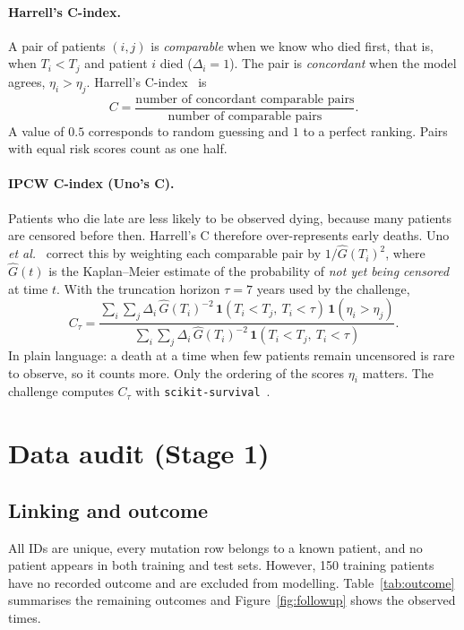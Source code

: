 \documentclass[11pt,a4paper]{article}
\begin{document}
\paragraph{Harrell's C-index.}
A pair of patients $(i,j)$ is \emph{comparable} when we know who died first, that is,
when $T_i < T_j$ and patient $i$ died ($\Delta_i = 1$). The pair is \emph{concordant}
when the model agrees, $\eta_i > \eta_j$. Harrell's C-index~\cite{harrell1982} is
\begin{equation}
C = \frac{\text{number of concordant comparable pairs}}{\text{number of comparable pairs}}.
\label{eq:harrell}
\end{equation}
A value of $0.5$ corresponds to random guessing and $1$ to a perfect ranking. Pairs
with equal risk scores count as one half.

\paragraph{IPCW C-index (Uno's C).}
Patients who die late are less likely to be observed dying, because many patients are
censored before then. Harrell's C therefore over-represents early deaths. Uno
\textit{et al.}~\cite{uno2011} correct this by weighting each comparable pair by
$1/\hat G(T_i)^2$, where $\hat G(t)$ is the Kaplan--Meier estimate of the probability
of \emph{not yet being censored} at time $t$. With the truncation horizon $\tau = 7$
years used by the challenge,
\begin{equation}
C_\tau = \frac{\displaystyle\sum_{i}\sum_{j} \Delta_i\,\hat G(T_i)^{-2}\,
\mathbf{1}(T_i < T_j,\ T_i < \tau)\,\mathbf{1}(\eta_i > \eta_j)}
{\displaystyle\sum_{i}\sum_{j} \Delta_i\,\hat G(T_i)^{-2}\,
\mathbf{1}(T_i < T_j,\ T_i < \tau)}.
\label{eq:uno}
\end{equation}
In plain language: a death at a time when few patients remain uncensored is rare to
observe, so it counts more. Only the ordering of the scores $\eta_i$ matters. The
challenge computes $C_\tau$ with \texttt{scikit-survival}~\cite{polsterl2020}.

\section{Data audit (Stage 1)}

\subsection{Linking and outcome}
All IDs are unique, every mutation row belongs to a known patient, and no patient
appears in both training and test sets. However, 150 training patients have no
recorded outcome and are excluded from modelling. Table~\ref{tab:outcome} summarises
the remaining outcomes and Figure~\ref{fig:followup} shows the observed times.
\end{document}
